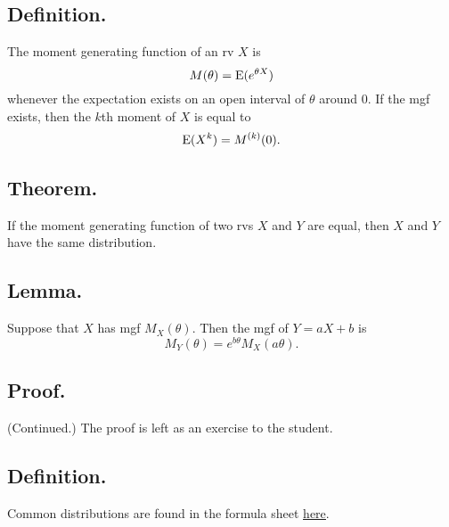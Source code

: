 \documentclass[titlepage]{article}
\begin{document}
\subsection{Definition.} The moment generating function of an rv $X$ is 
$$M(\theta) = \text{E}(e^{\theta X})$$
whenever the expectation exists on an open interval of $\theta$ around $0$. If the mgf exists, then the $k$th moment of $X$ is equal to 
$$\text{E}(X^{k}) = M^{(k)}(0).$$

\subsection{Theorem.} If the moment generating function of two rvs $X$ and $Y$ are equal, then $X$ and $Y$ have the same distribution.

\subsection{Lemma.} Suppose that $X$ has mgf $M_{X}(\theta)$. Then the mgf of $Y = aX + b$ is
$$M_{Y}(\theta) = e^{b\theta}M_{X}(a\theta).$$

\subsection{Proof.} (Continued.) The proof is left as an exercise to the student.

\subsection{Definition.} Common distributions are found in the formula sheet \href{https://github.com/dyao13/EN_553_420_SP24/blob/main/420distribution_table.pdf}{\underline{here}}.
\end{document}

